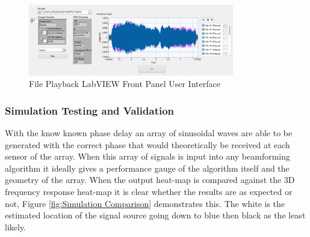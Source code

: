 \documentclass{UoNMCHA}
\numberwithin{equation}{section}
\begin{document}
    \begin{figure}[H]
        \centering
        \includegraphics[keepaspectratio, width = 0.8\textwidth]{Figures/FilePlaybackPanel.png}
        \caption{File Playback LabVIEW Front Panel User Interface}
        \label{fig:FilePlaybackPanel}
    \end{figure}  

\subsubsection{Simulation Testing and Validation} \label{sec:Sim Testing and Verification} 
    
    With the know known phase delay an array of sinusoidal waves are able to be generated with the correct phase that would theoretically be received at each sensor of the array. When this array of signals is input into any beamforming algorithm it ideally gives a performance gauge of the algorithm itself and the geometry of the array. When the output heat-map is compared against the 3D frequency response heat-map it is clear whether the results are as expected or not, Figure \ref{fig:Simulation Comparison} demonstrates this. The white is the estimated location of the signal source going down to blue then black as the least likely.
    
\end{document}
